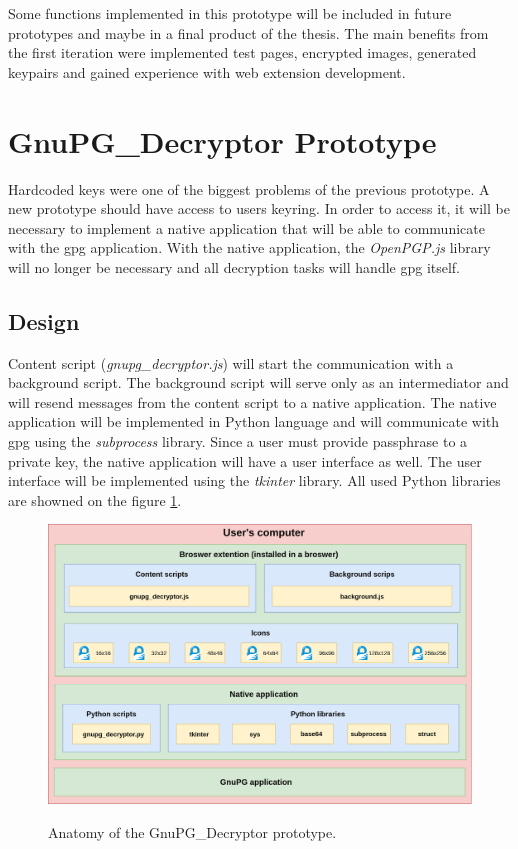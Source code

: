 Some functions implemented in this prototype will be included in future prototypes and maybe in a final product of the thesis. The main benefits from the first iteration were implemented test pages, encrypted images, generated keypairs and gained experience with web extension development.

\section{GnuPG\_Decryptor Prototype}
\label{prototype:GnuPG_Decryptor}
Hardcoded keys were one of the biggest problems of the previous prototype. A new prototype should have access to users keyring. In order to access it, it will be necessary to implement a native application that will be able to communicate with the gpg application. With the native application, the \textit{OpenPGP.js} library will no longer be necessary and all decryption tasks will handle gpg itself.

\subsection{Design}
Content script (\textit{gnupg\_decryptor.js}) will start the communication with a background script. The background script will serve only as an intermediator and will resend messages from the content script to a native application. The native application will be implemented in Python language and will communicate with gpg using the \textit{subprocess} library. Since a user must provide passphrase to a private key, the native application will have a user interface as well. The user interface will be implemented using the \textit{tkinter} library. All used Python libraries are showned on the figure \ref{img:gnupg_decryptorAnatomy}.

\begin{figure}[H]
    \begin{center}
        \label{img:gnupg_decryptorAnatomy}
        \includegraphics[width=1.0\textwidth]{obrazky-figures/prototype-GnuPG_Decryptor.png}
        \caption{Anatomy of the GnuPG\_Decryptor prototype.}
    \end{center}
\end{figure}

